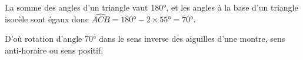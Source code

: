 \begin{corrige}
\begin{enumerate}
        {\red La somme des angles d'un triangle vaut \ang{180}, et les angles à la base d'un triangle isocèle sont égaux donc $\widehat{ACB}=\ang{180}-2\times \ang{55}=\ang{70}$.
        
        D'où rotation d'angle \ang{70} dans le sens inverse des aiguilles d'une montre, sens anti-horaire ou sens positif.}
    \end{enumerate}
\end{corrige}

